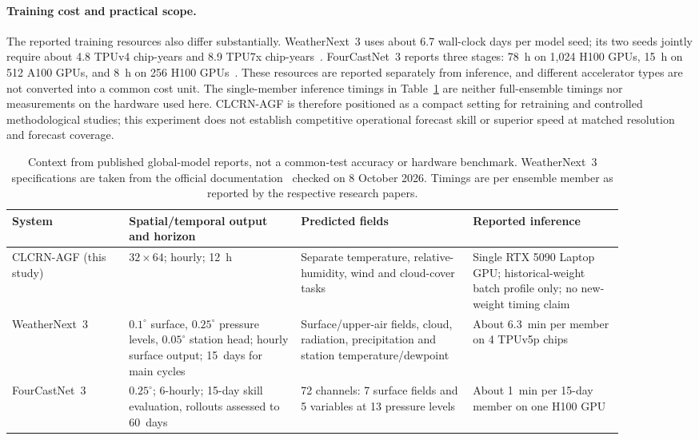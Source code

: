 \documentclass[fleqn,10pt]{wlscirep}
\begin{document}
\paragraph{Training cost and practical scope.}
The reported training resources also differ substantially. WeatherNext~3
uses about 6.7 wall-clock days per model seed; its two seeds jointly
require about 4.8 TPUv4 chip-years and 8.9 TPU7x chip-years~\cite{rasp2026weathernext3}.
FourCastNet~3 reports three stages: 78~h on 1,024 H100 GPUs, 15~h on
512 A100 GPUs, and 8~h on 256 H100 GPUs~\cite{bonev2025fourcastnet3}.
These resources are reported separately from inference, and different
accelerator types are not converted into a common cost unit. The
single-member inference timings in Table~\ref{tab:large_weather_context}
are neither full-ensemble timings nor measurements on the hardware used here.
CLCRN-AGF is therefore positioned as a compact setting for retraining and
controlled methodological studies; this experiment does not establish
competitive operational forecast skill or superior speed at matched
resolution and forecast coverage.

\begin{table}[htbp]
\centering
\small
\caption{Context from published global-model reports, not a common-test
accuracy or hardware benchmark. WeatherNext~3 specifications are taken
from the official documentation~\cite{google2026wn3docs} checked on
8 October 2026. Timings are
per ensemble member as reported by the respective research papers.}
\label{tab:large_weather_context}
\begin{tabular}{p{0.17\linewidth}p{0.25\linewidth}p{0.25\linewidth}p{0.22\linewidth}}
\toprule
System & Spatial/temporal output and horizon & Predicted fields & Reported inference \\
\midrule
CLCRN-AGF (this study) & $32\times64$; hourly; 12~h & Separate temperature, relative-humidity, wind and cloud-cover tasks & Single RTX 5090 Laptop GPU; historical-weight batch profile only; no new-weight timing claim \\
WeatherNext~3~\cite{rasp2026weathernext3} & $0.1^\circ$ surface, $0.25^\circ$ pressure levels, $0.05^\circ$ station head; hourly surface output; 15~days for main cycles & Surface/upper-air fields, cloud, radiation, precipitation and station temperature/dewpoint & About 6.3~min per member on 4 TPUv5p chips \\
FourCastNet~3~\cite{bonev2025fourcastnet3} & $0.25^\circ$; 6-hourly; 15-day skill evaluation, rollouts assessed to 60~days & 72 channels: 7 surface fields and 5 variables at 13 pressure levels & About 1~min per 15-day member on one H100 GPU \\
\bottomrule
\end{tabular}
\end{table}
\end{document}
